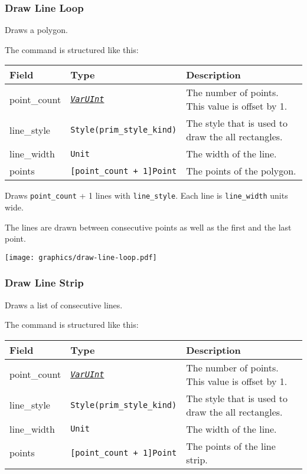 \documentclass[]{article}
\newcommand{\link}[2]{\hyperlink{#1}{\emph{#2}}}
\begin{document}
\hypertarget{draw-line-loop}{\subsubsection{Draw Line Loop}\label{draw-line-loop}}

Draws a polygon.

The command is structured like this:

\begin{longtable}[]{@{}p{1in}p{2in}p{3in}@{}}
\toprule
Field & Type & Description \\
\midrule
\endhead
point\_count & \link{varuint}{\texttt{VarUInt}}       & The number of points. This value is offset by 1. \\
line\_style  & \texttt{Style(prim\_style\_kind)}      & The style that is used to draw the all rectangles. \\
line\_width  & \texttt{Unit}                          & The width of the line. \\
points       & \texttt{{[}point\_count\ +\ 1{]}Point} & The points of the polygon. \\
\bottomrule
\end{longtable}

Draws \texttt{point\_count} + 1 lines with \texttt{line\_style}. Each
line is \texttt{line\_width} units wide.

The lines are drawn between consecutive points as well as the first and
the last point.

\begin{center}
\texttt{[image: graphics/draw-line-loop.pdf]}
\end{center}

\hypertarget{draw-line-strip}{\subsubsection{Draw Line Strip}\label{draw-line-strip}}

Draws a list of consecutive lines.

The command is structured like this:

\begin{longtable}[]{@{}p{1in}p{2in}p{3in}@{}}
\toprule
Field & Type & Description \\
\midrule
\endhead
point\_count & \link{varuint}{\texttt{VarUInt}}       & The number of points. This value is offset by 1. \\
line\_style  & \texttt{Style(prim\_style\_kind)}      & The style that is used to draw the all rectangles. \\
line\_width  & \texttt{Unit}                          & The width of the line. \\
points       & \texttt{{[}point\_count\ +\ 1{]}Point} & The points of the line strip. \\
\bottomrule
\end{longtable}
\end{document}
